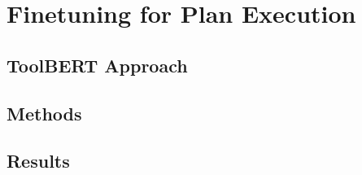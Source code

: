 

\chapter{Finetuning for Plan Execution}\label{chapter:finetuning_techniques}

\section{ToolBERT Approach}

\section{Methods}

\section{Results}